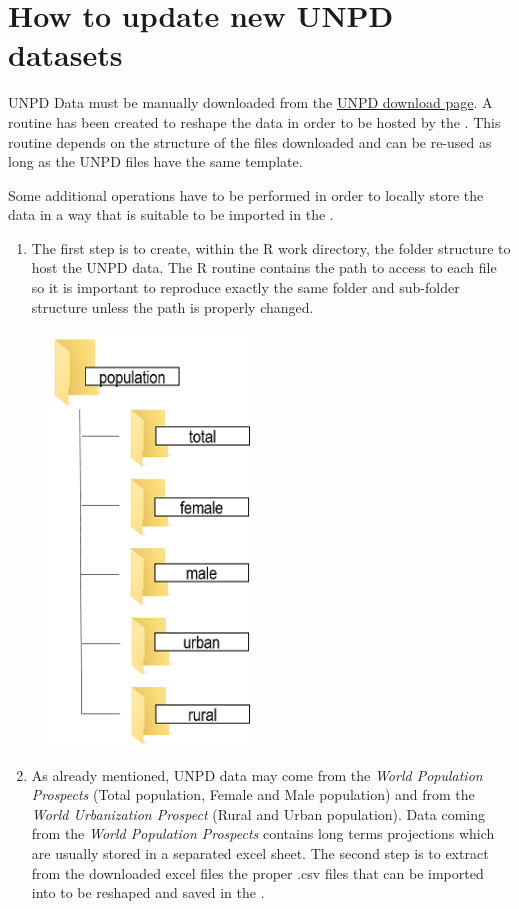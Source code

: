 \documentclass[nojss]{jss}\usepackage[]{graphicx}\usepackage[]{color}
\begin{document}
\section{How to update new UNPD datasets}

UNPD Data must be manually downloaded from the \href{http://www.un.org/en/development/desa/population/publications/database/index.shtml}{UNPD download page}. A routine has been created to reshape the data in order to be hosted by the . This routine depends on the structure of the files downloaded and can be re-used as long as the UNPD files have the same template.

Some additional operations have to be performed in order to locally store the data in a way that is suitable to be imported in the .
\begin{enumerate}
\item{The first step is to create, within the R work directory, the folder structure to host the UNPD data. The R routine contains the path to access to each file so it is important to reproduce exactly the same folder and sub-folder structure unless the path is properly changed.





\begin{center}
\includegraphics[width=6cm, height=11cm]{folderStructure}
\end{center}
}
\item{As already mentioned, UNPD data may come from the \textit{World Population Prospects} (Total population, Female and Male population) and from the \textit{World Urbanization Prospect} (Rural and Urban population). Data coming from the  \textit{World Population Prospects} contains long terms projections which are usually stored in a separated excel sheet. The second step is to extract from the downloaded excel files the proper .csv files that can be imported into  to be reshaped and saved in the .



}
\end{enumerate}
\end{document}
